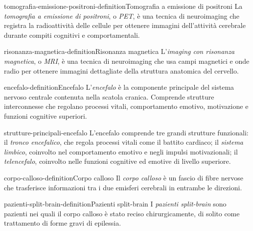 \documentclass[preview]{standalone}
\begin{document}
\begin{snippetdefinition}{tomografia-emissione-positroni-definition}{Tomografia a emissione di positroni}
    La \emph{tomografia a emissione di positroni}, o \emph{PET}, è una tecnica
    di neuroimaging che registra la radioattività delle cellule per ottenere
    immagini dell'attività cerebrale durante compiti cognitivi e
    comportamentali.
\end{snippetdefinition}

\begin{snippetdefinition}{risonanza-magnetica-definition}{Risonanza magnetica}
    L'\emph{imaging con risonanza magnetica}, o \emph{MRI}, è una tecnica di
    neuroimaging che usa campi magnetici e onde radio per ottenere immagini
    dettagliate della struttura anatomica del cervello.
\end{snippetdefinition}

\begin{snippetdefinition}{encefalo-definition}{Encefalo}
    L'\emph{encefalo} è la componente principale del sistema nervoso centrale
    contenuta nella scatola cranica. Comprende strutture interconnesse che
    regolano processi vitali, comportamento emotivo, motivazione e funzioni
    cognitive superiori.
\end{snippetdefinition}

\begin{snippet}{strutture-principali-encefalo}
    L'encefalo comprende tre grandi strutture funzionali: il
    \emph{tronco encefalico}, che regola processi vitali come il battito
    cardiaco; il \emph{sistema limbico}, coinvolto nel comportamento emotivo e
    negli impulsi motivazionali; il \emph{telencefalo}, coinvolto nelle funzioni
    cognitive ed emotive di livello superiore.
\end{snippet}


\begin{snippetdefinition}{corpo-calloso-definition}{Corpo calloso}
    Il \emph{corpo calloso} è un fascio di fibre nervose che trasferisce
    informazioni tra i due emisferi cerebrali in entrambe le direzioni.
\end{snippetdefinition}

\begin{snippetdefinition}{pazienti-split-brain-definition}{Pazienti split-brain}
    I \emph{pazienti split-brain} sono pazienti nei quali il corpo calloso è
    stato reciso chirurgicamente, di solito come trattamento di forme gravi di
    epilessia.
\end{snippetdefinition}
\end{document}
